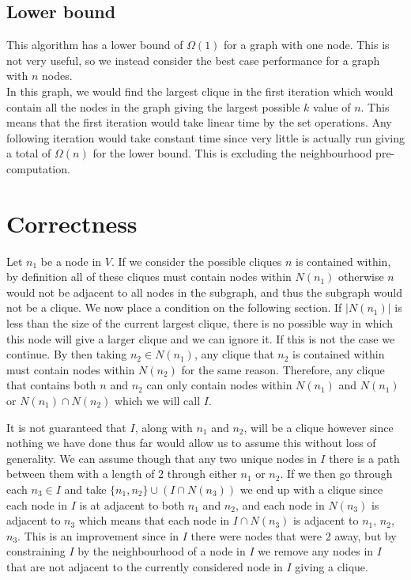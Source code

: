 \documentclass[11pt]{article}
\begin{document}
\subsection{Lower bound}
This algorithm has a lower bound of $\Omega(1)$ for a graph with one node. This is not very useful, so we instead consider the best case performance for a graph with $n$ nodes.\\

In this graph, we would find the largest clique in the first iteration which would contain all the nodes in the graph giving the largest possible $k$ value of $n$. This means that the first iteration would take linear time by the set operations. Any following iteration would take constant time since very little is actually run giving a total of $\Omega(n)$ for the lower bound. This is excluding the neighbourhood pre-computation.

\section{Correctness}

Let $n_1$ be a node in $V$. If we consider the possible cliques $n$ is contained within, by definition all of these cliques must contain nodes within $N(n_1)$ otherwise $n$ would not be adjacent to all nodes in the subgraph, and thus the subgraph would not be a clique. We now place a condition on the following section. If $|N(n_1)|$ is less than the size of the current largest clique, there is no possible way in which this node will give a larger clique and we can ignore it. If this is not the case we continue. By then taking $n_2\in N(n_1)$, any clique that $n_2$ is contained within must contain nodes within $N(n_2)$ for the same reason. Therefore, any clique that contains both $n$ and $n_2$ can only contain nodes within $N(n_1)$ and $N(n_1)$ or $N(n_1)\cap N(n_2)$ which we will call $I$.

It is not guaranteed that $I$, along with $n_1$ and $n_2$, will be a clique however since nothing we have done thus far would allow us to assume this without loss of generality. We can assume though that any two unique nodes in $I$ there is a path between them with a length of 2 through either $n_1$ or $n_2$. If we then go through each $n_3\in I$ and take $\{n_1,n_2\}\cup (I\cap N(n_3))$ we end up with a clique since each node in $I$ is at adjacent to both $n_1$ and $n_2$, and each node in $N(n_3)$ is adjacent to $n_3$ which means that each node in $I\cap N(n_3)$ is adjacent to $n_1$, $n_2$, $n_3$. This is an improvement since in $I$ there were nodes that were 2 away, but by constraining $I$ by the neighbourhood of a node in $I$ we remove any nodes in $I$ that are not adjacent to the currently considered node in $I$ giving a clique.
\end{document}
